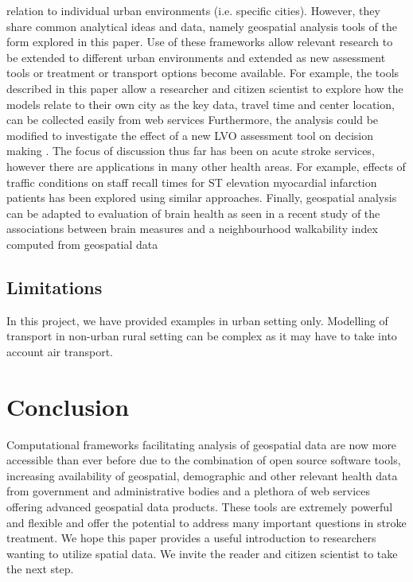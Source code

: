 \documentclass[utf8]{frontiersHLTH}
\begin{document}
relation to individual urban environments (i.e. specific
cities). However, they share common analytical ideas and data, namely
geospatial analysis tools of the form explored in this paper. Use of
these frameworks allow relevant research to be extended to different
urban environments and extended as new assessment tools or treatment
or transport options become available. For example, the tools
described in this paper allow a researcher and citizen scientist to
explore how the models relate to their own city as the key data,
travel time and center location, can be collected easily from web
services \cite{10.1001/jamaneurol.2018.2424,Milne_2017} Furthermore,
the analysis could be modified to investigate the effect of a new LVO
assessment tool on decision making
\cite{10.3389/fneur.2019.00130}. The focus of discussion thus far has
been on acute stroke services, however there are applications in many
other health areas. For example, effects of traffic conditions on
staff recall times for ST elevation myocardial infarction patients has
been explored using similar
approaches\cite{10.3389/fcvm.2017.00089}. Finally, geospatial analysis
can be adapted to evaluation of brain health as seen in a recent study
of the associations between brain measures and a neighbourhood
walkability index computed from geospatial data
\cite{cerin2017associations}

\subsection{Limitations} 
In this project, we have provided examples in urban setting
only. Modelling of transport in non-urban rural setting can be complex
as it may have to take into account air transport.

\section{Conclusion} 
Computational frameworks facilitating analysis of geospatial data are
now more accessible than ever before due to the combination of open
source software tools, increasing availability of geospatial,
demographic and other relevant health data from government and
administrative bodies and a plethora of web services offering advanced
geospatial data products. These tools are extremely powerful and
flexible and offer the potential to address many important questions
in stroke treatment. We hope this paper provides a useful introduction
to researchers wanting to utilize spatial data. We invite the reader
and citizen scientist to take the next step.
\end{document}
